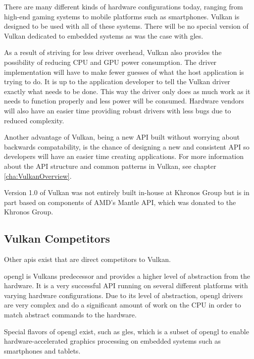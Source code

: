     There are many different kinds of hardware configurations today, ranging from high-end gaming systems to mobile platforms such as smartphones.
    Vulkan is designed to be used with all of these systems.
    There will be no special version of Vulkan dedicated to embedded systems as was the case with \gls{gles}.

    As a result of striving for less driver overhead, Vulkan also provides the possibility of reducing CPU and GPU power consumption.
    The driver implementation will have to make fewer guesses of what the host application is trying to do.
    It is up to the application developer to tell the Vulkan driver exactly what needs to be done.
    This way the driver only does as much work as it needs to function properly and less power will be consumed.
    Hardware vendors will also have an easier time providing robust drivers with less bugs due to reduced complexity.

    Another advantage of Vulkan, being a new API built without worrying about backwards compatability, is the chance of designing a new and consistent API so developers will have an easier time creating applications.
    For more information about the API structure and common patterns in Vulkan, see chapter \ref{cha:VulkanOverview}.

    Version 1.0 of Vulkan was not entirely built in-house at Khronos Group but is in part based on components of AMD's Mantle API, which was donated to the Khronos Group.


    \subsection{Vulkan Competitors}

      Other \glspl{api} exist that are direct competitors to Vulkan.

      \gls{opengl} is Vulkans predecessor and provides a higher level of abstraction from the hardware.
      It is a very successful API running on several different platforms with varying hardware configurations.
      Due to its level of abstraction, \gls{opengl} drivers are very complex and do a significant amount of work on the CPU in order to match abstract commands to the hardware.

      Special flavors of \gls{opengl} exist, such as \gls{gles}, which is a subset of \gls{opengl} to enable hardware-accelerated graphics processing on embedded systems such as smartphones and tablets.

